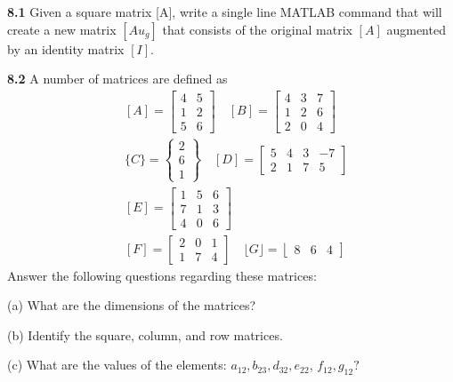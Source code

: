 \documentclass[../main.tex]{subfiles}
\begin{document}
\begin{multicols}{2}
    \noindent \textbf{8.1} Given a square matrix [A], write a single line MATLAB command that will create a new matrix $\left[A u_{g}\right]$ that consists of the original matrix $[A]$ augmented by an identity matrix $[I]$.
    
    \noindent \textbf{8.2} A number of matrices are defined as
    $$
    \begin{aligned}
    &{[A]=\left[\begin{array}{ll}
    4 & 5 \\
    1 & 2 \\
    5 & 6
    \end{array}\right] \quad[B]=\left[\begin{array}{lll}
    4 & 3 & 7 \\
    1 & 2 & 6 \\
    2 & 0 & 4
    \end{array}\right]} \\
    &\{C\}=\left\{\begin{array}{l}
    2 \\
    6 \\
    1
    \end{array}\right\} \quad[D]=\left[\begin{array}{cccc}
    5 & 4 & 3 & -7 \\
    2 & 1 & 7 & 5
    \end{array}\right] \\
    &{[E]=\left[\begin{array}{lll}
    1 & 5 & 6 \\
    7 & 1 & 3 \\
    4 & 0 & 6
    \end{array}\right]} \\
    &{[F]=\left[\begin{array}{lll}
    2 & 0 & 1 \\
    1 & 7 & 4
    \end{array}\right] \quad\lfloor G\rfloor=\left\lfloor\begin{array}{lll}
    8 & 6 & 4
    \end{array}\right]}
    \end{aligned}
    $$
    Answer the following questions regarding these matrices:

    \noindent (a) What are the dimensions of the matrices?

    \noindent (b) Identify the square, column, and row matrices.

    \noindent (c) What are the values of the elements: $a_{12}, b_{23}, d_{32}, e_{22}$, $f_{12}, g_{12} ?$
    

\end{multicols}
\end{document}
